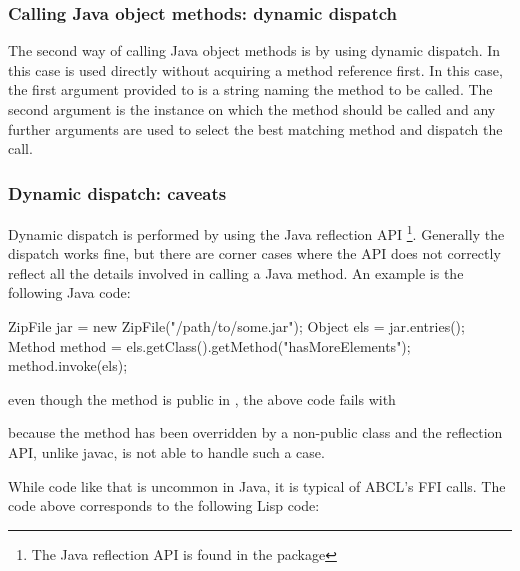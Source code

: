 \documentclass[10pt]{book}
\begin{document}
\subsubsection{Calling Java object methods: dynamic dispatch}

The second way of calling Java object methods is by using dynamic dispatch.
In this case  is used directly without acquiring a method
reference first. In this case, the first argument provided to 
is a string naming the method to be called. The second argument is the instance
on which the method should be called and any further arguments are used to
select the best matching method and dispatch the call.

\subsubsection{Dynamic dispatch: caveats}

Dynamic dispatch is performed by using the Java reflection
API \footnote{The Java reflection API is found in the
   package}. Generally the dispatch works
fine, but there are corner cases where the API does not correctly
reflect all the details involved in calling a Java method. An example
is the following Java code:

\begin{listing-java}
ZipFile jar = new ZipFile("/path/to/some.jar");
Object els = jar.entries();
Method method = els.getClass().getMethod("hasMoreElements");
method.invoke(els);
\end{listing-java}

even though the method  is public in ,
the above code fails with


because the method has been overridden by a non-public class and the
reflection API, unlike javac, is not able to handle such a case.

While code like that is uncommon in Java, it is typical of ABCL's FFI
calls. The code above corresponds to the following Lisp code:
\end{document}
